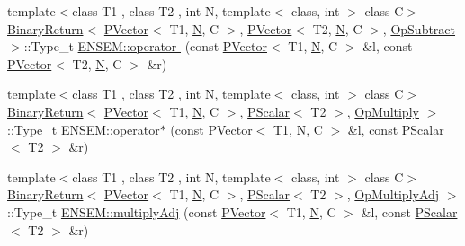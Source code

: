 \begin{DoxyCompactItemize}
{\footnotesize template$<$class T1 , class T2 , int N, template$<$ class, int $>$ class C$>$ }\\\mbox{\hyperlink{structENSEM_1_1BinaryReturn}{Binary\+Return}}$<$ \mbox{\hyperlink{classENSEM_1_1PVector}{P\+Vector}}$<$ T1, \mbox{\hyperlink{operator__name__util_8cc_a7722c8ecbb62d99aee7ce68b1752f337}{N}}, C $>$, \mbox{\hyperlink{classENSEM_1_1PVector}{P\+Vector}}$<$ T2, \mbox{\hyperlink{operator__name__util_8cc_a7722c8ecbb62d99aee7ce68b1752f337}{N}}, C $>$, \mbox{\hyperlink{structENSEM_1_1OpSubtract}{Op\+Subtract}} $>$\+::Type\+\_\+t \mbox{\hyperlink{group__primvector_ga88c10d1dc134a68481b630e96762938a}{E\+N\+S\+E\+M\+::operator-\/}} (const \mbox{\hyperlink{classENSEM_1_1PVector}{P\+Vector}}$<$ T1, \mbox{\hyperlink{operator__name__util_8cc_a7722c8ecbb62d99aee7ce68b1752f337}{N}}, C $>$ \&l, const \mbox{\hyperlink{classENSEM_1_1PVector}{P\+Vector}}$<$ T2, \mbox{\hyperlink{operator__name__util_8cc_a7722c8ecbb62d99aee7ce68b1752f337}{N}}, C $>$ \&r)
\item 
{\footnotesize template$<$class T1 , class T2 , int N, template$<$ class, int $>$ class C$>$ }\\\mbox{\hyperlink{structENSEM_1_1BinaryReturn}{Binary\+Return}}$<$ \mbox{\hyperlink{classENSEM_1_1PVector}{P\+Vector}}$<$ T1, \mbox{\hyperlink{operator__name__util_8cc_a7722c8ecbb62d99aee7ce68b1752f337}{N}}, C $>$, \mbox{\hyperlink{classENSEM_1_1PScalar}{P\+Scalar}}$<$ T2 $>$, \mbox{\hyperlink{structENSEM_1_1OpMultiply}{Op\+Multiply}} $>$\+::Type\+\_\+t \mbox{\hyperlink{group__primvector_ga345fa1d5e68f5801446f6ff69feb2121}{E\+N\+S\+E\+M\+::operator$\ast$}} (const \mbox{\hyperlink{classENSEM_1_1PVector}{P\+Vector}}$<$ T1, \mbox{\hyperlink{operator__name__util_8cc_a7722c8ecbb62d99aee7ce68b1752f337}{N}}, C $>$ \&l, const \mbox{\hyperlink{classENSEM_1_1PScalar}{P\+Scalar}}$<$ T2 $>$ \&r)
\item 
{\footnotesize template$<$class T1 , class T2 , int N, template$<$ class, int $>$ class C$>$ }\\\mbox{\hyperlink{structENSEM_1_1BinaryReturn}{Binary\+Return}}$<$ \mbox{\hyperlink{classENSEM_1_1PVector}{P\+Vector}}$<$ T1, \mbox{\hyperlink{operator__name__util_8cc_a7722c8ecbb62d99aee7ce68b1752f337}{N}}, C $>$, \mbox{\hyperlink{classENSEM_1_1PScalar}{P\+Scalar}}$<$ T2 $>$, \mbox{\hyperlink{structENSEM_1_1OpMultiplyAdj}{Op\+Multiply\+Adj}} $>$\+::Type\+\_\+t \mbox{\hyperlink{group__primvector_gab03f792e64e0e2073c0ab9f04fa4518f}{E\+N\+S\+E\+M\+::multiply\+Adj}} (const \mbox{\hyperlink{classENSEM_1_1PVector}{P\+Vector}}$<$ T1, \mbox{\hyperlink{operator__name__util_8cc_a7722c8ecbb62d99aee7ce68b1752f337}{N}}, C $>$ \&l, const \mbox{\hyperlink{classENSEM_1_1PScalar}{P\+Scalar}}$<$ T2 $>$ \&r)

\end{DoxyCompactItemize}
